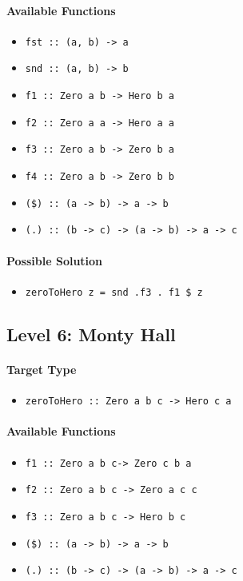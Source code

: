 \documentclass[preprint,12pt]{elsarticle}
\begin{document}
\paragraph{Available Functions} 
\begin{itemize}
    \item \texttt{fst :: (a, b) -> a}
    \item \texttt{snd :: (a, b) -> b}
    \item \texttt{f1 :: Zero a b -> Hero b a}
    \item \texttt{f2 :: Zero a a -> Hero a a}
    \item \texttt{f3 :: Zero a b -> Zero b a}
    \item \texttt{f4 :: Zero a b -> Zero b b}
    \item \texttt{(\$) :: (a -> b) -> a -> b}
    \item \texttt{(.) :: (b -> c) -> (a -> b) -> a -> c}
\end{itemize}

\paragraph{Possible Solution} 
\begin{itemize}
    \item \texttt{zeroToHero z = snd .f3 . f1 \$ z}
\end{itemize}


\subsection{Level 6: Monty Hall}
\paragraph{Target Type } 
\begin{itemize}
    \item \texttt{zeroToHero :: Zero a b c -> Hero c a}
\end{itemize}

\paragraph{Available Functions} 
\begin{itemize}
    \item \texttt{f1 :: Zero a b c-> Zero c b a}
    \item \texttt{f2 :: Zero a b c -> Zero a c c}
    \item \texttt{f3 :: Zero a b c -> Hero b c}
    \item \texttt{(\$) :: (a -> b) -> a -> b}
    \item \texttt{(.) :: (b -> c) -> (a -> b) -> a -> c}
\end{itemize}
\end{document}
